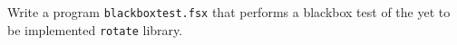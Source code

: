 Write a program \lstinline{blackboxtest.fsx} that performs a blackbox test of the yet to be implemented \lstinline{rotate} library.
